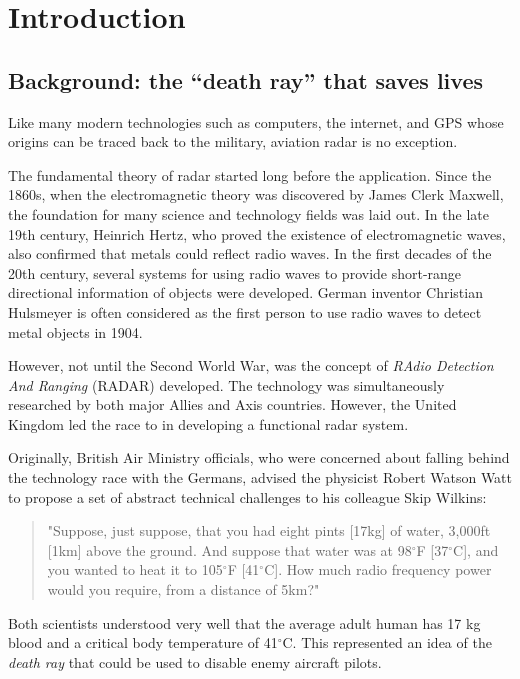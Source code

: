 \chapter{Introduction} \label{chap:intro}

\section{Background: the ``death ray'' that saves lives}

Like many modern technologies such as computers, the internet, and GPS whose origins can be traced back to the military, aviation radar is no exception. 

The fundamental theory of radar started long before the application. Since the 1860s, when the electromagnetic theory was discovered by James Clerk Maxwell, the foundation for many science and technology fields was laid out. In the late 19th century, Heinrich Hertz, who proved the existence of electromagnetic waves, also confirmed that metals could reflect radio waves. In the first decades of the 20th century, several systems for using radio waves to provide short-range directional information of objects were developed. German inventor Christian Hulsmeyer is often considered as the first person to use radio waves to detect metal objects in 1904.

However, not until the Second World War, was the concept of \emph{RAdio Detection And Ranging} (RADAR) developed. The technology was simultaneously researched by both major Allies and Axis countries. However, the United Kingdom led the race to in developing a functional radar system. 

Originally, British Air Ministry officials, who were concerned about falling behind the technology race with the Germans, advised the physicist Robert Watson Watt to propose a set of abstract technical challenges to his colleague Skip Wilkins:

\begin{quotation}
\noindent"Suppose, just suppose, that you had eight pints [17kg] of water, 3,000ft [1km] above the ground. And suppose that water was at 98$^\circ$F [37$^\circ$C], and you wanted to heat it to 105$^\circ$F [41$^\circ$C]. How much radio frequency power would you require, from a distance of 5km?"
\end{quotation}

Both scientists understood very well that the average adult human has 17 kg blood and a critical body temperature of 41$^\circ$C. This represented an idea of the \emph{death ray} that could be used to disable enemy aircraft pilots.

